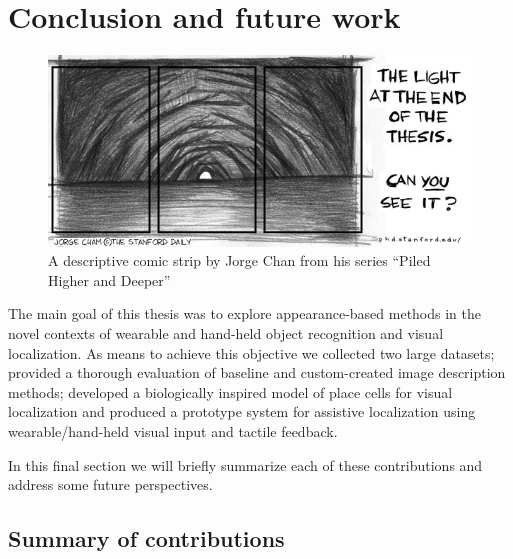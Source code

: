 \chapter{Conclusion and future work}\label{ch:conclusion}

\begin{figure}[h!]
\centering
\includegraphics[width=.8\textwidth]{./gfx/Chapter07/phd051700s.jpg}
\caption{A descriptive comic strip by Jorge Chan from his series ``Piled Higher and Deeper'' \cite{ChamPhD}}
\end{figure}

The main goal of this thesis was to explore appearance-based methods in the novel contexts of wearable and hand-held object recognition and visual localization. As means to achieve this objective we collected two large datasets; provided a thorough evaluation of baseline and custom-created image description methods; developed a biologically inspired model of place cells for visual localization and produced a prototype system for assistive localization using wearable/hand-held visual input and tactile feedback.

In this final section we will briefly summarize each of these contributions and address some future perspectives.
\section{Summary of contributions}

